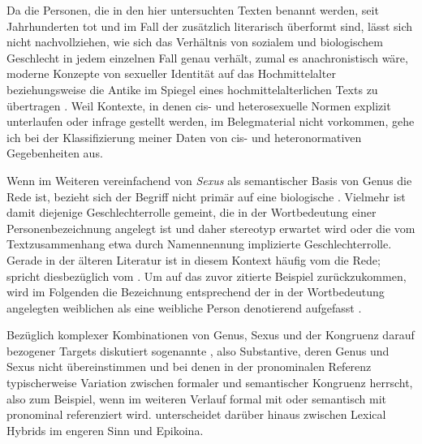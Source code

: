 Da die Personen, die in den hier untersuchten Texten benannt werden, seit
Jahrhunderten tot und im Fall der \KC{} zusätzlich literarisch überformt sind,
lässt sich nicht nachvollziehen, wie sich das Verhältnis von sozialem und
biologischem Geschlecht in jedem einzelnen Fall
genau verhält, zumal es anachronistisch wäre, moderne Konzepte von sexueller
Identität auf das Hochmittelalter beziehungsweise die
Antike im Spiegel eines hochmittelalterlichen Texts zu übertragen
\autocite[siehe z.\,B.][]{klinger2002}. Weil Kontexte, in denen cis- und
heterosexuelle Normen explizit unterlaufen oder infrage
gestellt werden, im Belegmaterial nicht vorkommen, gehe ich bei der
Klassifizierung meiner Daten von cis- und heteronormativen Gegebenheiten aus.

Wenn im Weiteren vereinfachend von \textit{Sexus} als semantischer Basis
von Genus die Rede ist, bezieht sich der Begriff nicht primär auf eine
biologische . Vielmehr ist damit
diejenige Geschlechter\-rolle gemeint, die in der
Wortbedeutung einer Personenbezeichnung angelegt ist und daher stereotyp
erwartet wird oder die vom Textzusammenhang etwa durch Namennennung implizierte
Geschlechterrolle. Gerade in der älteren Literatur ist in
diesem Kontext häufig vom  die Rede;
\citet[67]{panther2009} spricht diesbezüglich vom
. Um auf das zuvor zitierte Beispiel zurückzukommen,
wird im Folgenden die Bezeichnung  entsprechend der in der
Wortbedeutung angelegten weiblichen  als eine weibliche
Person denotierend aufgefasst
\autocite[vgl.][s.\,v.~]{duden-online}.


Bezüglich komplexer Kombinationen von Genus, Sexus und der Kongruenz darauf
bezogener Targets diskutiert \citet[183--184]{corbett1991}
sogenannte , also
Substantive, deren Genus und Sexus nicht übereinstimmen und bei
denen in der pronominalen Referenz typischerweise Variation zwischen
formaler und semantischer
Kongruenz herrscht, also zum Beispiel, wenn  im weiteren Verlauf formal mit  oder semantisch mit 
pronominal referenziert wird. \citet{klein2022} unterscheidet darüber hinaus
zwischen Lexical Hybrids im engeren Sinn und
Epikoina.

